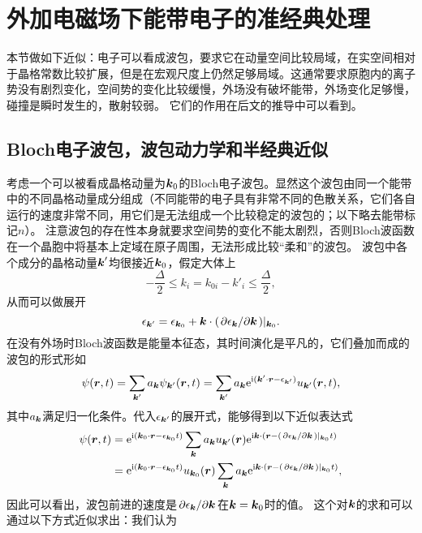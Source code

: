 
\section{外加电磁场下能带电子的准经典处理}

本节做如下近似：电子可以看成波包，要求它在动量空间比较局域，在实空间相对于晶格常数比较扩展，但是在宏观尺度上仍然足够局域。这通常要求原胞内的离子势没有剧烈变化，空间势的变化比较缓慢，外场没有破坏能带，外场变化足够慢，碰撞是瞬时发生的，散射较弱。 
它们的作用在后文的推导中可以看到。

\subsection{Bloch电子波包，波包动力学和半经典近似}\label{sec:bloch-wave-pocket}

考虑一个可以被看成晶格动量为$\vb*{k}_0$的Bloch电子波包。显然这个波包由同一个能带中的不同晶格动量成分组成（不同能带的电子具有非常不同的色散关系，它们各自运行的速度非常不同，用它们是无法组成一个比较稳定的波包的；以下略去能带标记$n$）。
注意波包的存在性本身就要求空间势的变化不能太剧烈，否则Bloch波函数在一个晶胞中将基本上定域在原子周围，无法形成比较“柔和”的波包。
波包中各个成分的晶格动量$\vb*{k}'$均很接近$\vb*{k}_0$，假定大体上
\begin{equation}
    - \frac{\Delta}{2} \leq k_i = k_{0i} - k'_i \leq \frac{\Delta}{2},
\end{equation}
从而可以做展开
\begin{equation}
    \epsilon_{\vb*{k}'} = \epsilon_{\vb*{k}_0} + \vb*{k} \cdot (\pdv*{\epsilon_{\vb*{k}}}{\vb*{k}})|_{\vb*{k}_0}.
\end{equation}
在没有外场时Bloch波函数是能量本征态，其时间演化是平凡的，它们叠加而成的波包的形式形如
\[
    \psi(\vb*{r}, t) = \sum_{\vb*{k}'} a_{\vb*{k}} \psi_{\vb*{k}'}(\vb*{r}, t) = \sum_{\vb*{k}'} a_{\vb*{k}} \mathrm{e}^{\mathrm{i} (\vb*{k}' \cdot \vb*{r} - \epsilon_{\vb*{k}'})} u_{\vb*{k}'}(\vb*{r}, t),
\]
其中$a_{\vb*{k}}$满足归一化条件。代入$\epsilon_{\vb*{k}'}$的展开式，能够得到以下近似表达式
\[
    \begin{aligned}
        \psi(\vb*{r}, t) &= \mathrm{e}^{\mathrm{i} (\vb*{k}_0 \cdot \vb*{r} - \epsilon_{\vb*{k}_0} t)} \sum_{\vb*{k}} a_{\vb*{k}} u_{\vb*{k}'}(\vb*{r}) \mathrm{e}^{\mathrm{i} \vb*{k} \cdot (\vb*{r} - (\pdv*{\epsilon_{\vb*{k}}}{\vb*{k}}) |_{\vb*{k}_0} t)} \\
        &= \mathrm{e}^{\mathrm{i} (\vb*{k}_0 \cdot \vb*{r} - \epsilon_{\vb*{k}_0} t)} u_{\vb*{k}_0}(\vb*{r}) \sum_{\vb*{k}} a_{\vb*{k}} \mathrm{e}^{\mathrm{i} \vb*{k} \cdot (\vb*{r} - (\pdv*{\epsilon_{\vb*{k}}}{\vb*{k}}) |_{\vb*{k}_0} t)}  ,
    \end{aligned}
\]
因此可以看出，波包前进的速度是$\pdv*{\epsilon_{\vb*{k}}}{\vb*{k}}$在$\vb*{k} = \vb*{k}_0$时的值。
这个对$\vb*{k}$的求和可以通过以下方式近似求出：我们认为%

